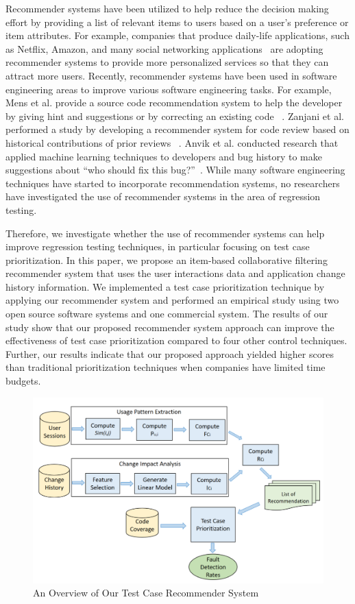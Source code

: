 Recommender systems have been utilized to help reduce the decision making 
effort by providing a list of relevant items to users based on a 
user's preference or item attributes.
For example, companies that produce daily-life applications, such as Netflix, 
Amazon, and many social networking applications~\cite{recomsurvey05}
are adopting recommender systems to provide more personalized services so that
they can attract more users. 
Recently, recommender systems have been used in software engineering areas 
to improve various software engineering tasks. 
For example, Mens et al. provide a source code recommendation 
system to help the developer by giving hint and suggestions or  
by correcting an existing code ~\cite{coderecommender}. 
Zanjani et al. performed a study by developing a recommender system for
code review based on historical contributions of prior reviews ~\cite{sara}. 
Anvik et al. conducted research that applied machine learning techniques
to developers and bug history to make suggestions about 
``who should fix this bug?''~\cite{who}.
While many software engineering techniques have started to incorporate 
recommendation systems, no researchers have investigated the use 
of recommender systems in the area of regression testing.

Therefore, we investigate whether the use of recommender systems can
help improve regression testing techniques, in particular focusing 
on test case prioritization.
In this paper, we propose an item-based collaborative filtering recommender 
system that uses the user interactions data
and application change history information.
We implemented a test case prioritization technique by applying our recommender system
and performed an empirical study using two open source software systems and one commercial system.
The results of our study show that our proposed recommender system approach can 
improve the effectiveness of test case prioritization 
compared to four other control techniques.
Further, our results indicate that our proposed approach yielded higher
scores than traditional prioritization techniques 
when companies have limited time budgets. 

\begin{figure}[!hb]
        \centering
        \includegraphics[width=0.75\linewidth]{./Overview6.png}
        \vspace*{3pt}
        \caption{An Overview of Our Test Case Recommender System}
        \label{fig:workflow}
\end{figure}

